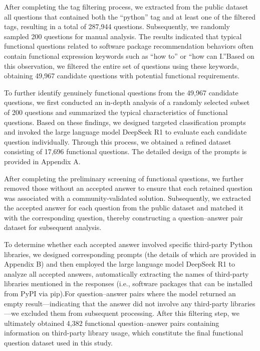After completing the tag filtering process, we extracted from the public dataset all questions that contained both the “python” tag and at least one of the filtered 
tags, resulting in a total of 287,944 questions. Subsequently, we randomly sampled 200 questions for manual analysis. The results indicated that typical functional 
questions related to software package recommendation behaviors often contain functional expression keywords such as “how to” or “how can I.”Based on this observation, 
we filtered the entire set of questions using these keywords, obtaining 49,967 candidate questions with potential functional requirements.

To further identify genuinely functional questions from the 49,967 candidate questions, we first conducted an in-depth analysis of a randomly selected subset of 200 
questions and summarized the typical characteristics of functional questions. Based on these findings, we designed targeted classification prompts and invoked the 
large language model DeepSeek R1 to evaluate each candidate question individually. Through this process, we obtained a refined dataset consisting of 17,696 functional 
questions. The detailed design of the prompts is provided in Appendix A.

After completing the preliminary screening of functional questions, we further removed those without an accepted answer to ensure that each retained question was 
associated with a community-validated solution. Subsequently, we extracted the accepted answer for each question from the public dataset and matched it with the 
corresponding question, thereby constructing a question–answer pair dataset for subsequent analysis.

To determine whether each accepted answer involved specific third-party Python libraries, we designed corresponding prompts (the details of which are provided in 
Appendix B) and then employed the large language model DeepSeek R1 to analyze all accepted answers, automatically extracting the names of third-party libraries 
mentioned in the responses (i.e., software packages that can be installed from PyPI via pip).For question–answer pairs where the model returned an empty 
result—indicating that the answer did not involve any third-party libraries—we excluded them from subsequent processing. After this filtering step, we ultimately 
obtained 4,382 functional question–answer pairs containing information on third-party library usage, which constitute the final functional question dataset used 
in this study.


